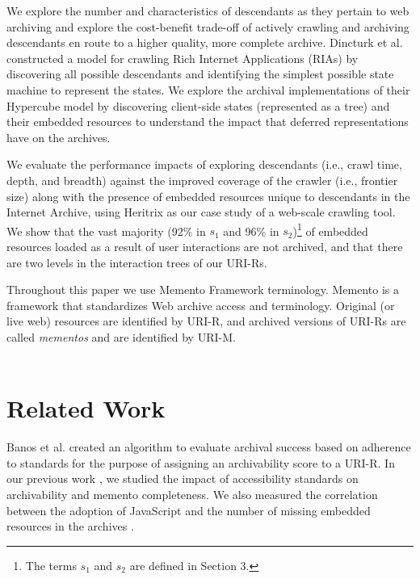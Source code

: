\documentclass{sig-alternate}
\begin{document}
We explore the number and characteristics of descendants as they pertain to web archiving and explore the cost-benefit trade-off of actively crawling and archiving descendants en route to a higher quality, more complete archive. Dincturk et al. \cite{dincturkAjax} constructed a model for crawling Rich Internet Applications (RIAs) by discovering all possible descendants and identifying the simplest possible state machine to represent the states. We explore the archival implementations of their Hypercube model by discovering client-side states (represented as a tree) and their embedded resources to understand the impact that deferred representations have on the archives. %


We evaluate the performance impacts of exploring descendants (i.e., crawl time, depth, and breadth) against the improved coverage of the crawler (i.e., frontier size) along with the presence of embedded resources unique to descendants in the Internet Archive, using Heritrix as our case study of a web-scale crawling tool. We show that the vast majority (92\% in $s_1$ and 96\% in $s_2$)\footnote{The terms $s_1$ and $s_2$ are defined in Section 3.} of embedded resources loaded as a result of user interactions are not archived, and that there are two levels in the interaction trees of our URI-Rs.

Throughout this paper we use Memento Framework terminology. Memento \cite{nelson:memento:tr, mementorfc} is a framework that standardizes Web archive access and terminology. Original (or live web) resources are identified by URI-R, and archived versions of URI-Rs are called \emph{mementos} and are identified by URI-M. 
\\\\

\section{Related Work}
\label{priorwork}
Banos et al. \cite{ipresArchivability} created an algorithm to evaluate archival success based on adherence to standards for the purpose of assigning an archivability score to a URI-R. In our previous work \cite{kellyTPDL2013}, we studied the impact of accessibility standards on archivability and memento completeness. We also measured the correlation between the adoption of JavaScript and the number of missing embedded resources in the archives \cite{ijdl}. 
\end{document}
